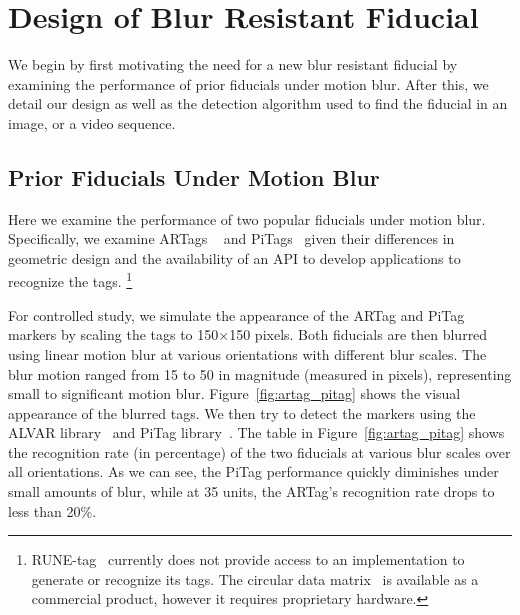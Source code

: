 \section{Design of Blur Resistant Fiducial}

We begin by first motivating the need for a new blur resistant
fiducial by examining the performance of prior fiducials under motion
blur.  After this, we detail our design as well as the detection
algorithm used to find the fiducial in an image, or a video sequence.

\subsection{Prior Fiducials Under Motion Blur}\label{sec:blurtest}

Here we examine the performance of two popular fiducials under
motion blur.  Specifically, we examine ARTags ~\cite{Fiala05} and
PiTags~\cite{Pitag13} given their differences in geometric design and
the availability of an API to develop applications to recognize the tags.
\footnote{RUNE-tag~\cite{runetag11} currently does not
provide access to an implementation to generate or recognize its tags. 
The circular data matrix~\cite{NaimarkF02} is available as a
commercial product, however it requires proprietary hardware.}

For controlled study, we simulate the appearance of the ARTag and PiTag
markers by scaling the tags to 150$\times$150 pixels.
Both fiducials are then blurred using linear motion blur at various
orientations with different  blur scales. The blur motion ranged from 15 to 50
in magnitude (measured in pixels), representing small to significant motion
blur. Figure~\ref{fig:artag_pitag} shows the visual appearance of the blurred
tags. We then try to detect the markers using the ALVAR library~\cite{alvar} and
PiTag library~\cite{ros_pitag}. The table in %
Figure~\ref{fig:artag_pitag} shows the recognition rate (in
percentage) of the two fiducials at various blur scales over all  orientations.
As we can see, the PiTag performance quickly diminishes under small amounts of
blur, while at 35 units, the ARTag's recognition rate drops to less than
20\%.

